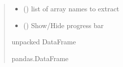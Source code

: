 \documentclass[letterpaper,10pt,english]{sphinxmanual}
\begin{document}
\begin{fulllineitems}
\begin{fulllineitems}
\begin{quote}
\begin{description}
\begin{itemize}
\item {} 
\sphinxAtStartPar
{} (\sphinxstyleliteralemphasis{\sphinxupquote{{[}}}\sphinxstyleliteralemphasis{\sphinxupquote{{]}}}) \textendash{} list of array names to extract

\item {} 
\sphinxAtStartPar
{} () \textendash{} Show/Hide progress bar

\end{itemize}

\sphinxAtStartPar
unpacked DataFrame

\sphinxAtStartPar
pandas.DataFrame


\end{description}
\end{quote}
\end{fulllineitems}
\end{fulllineitems}
\end{document}
